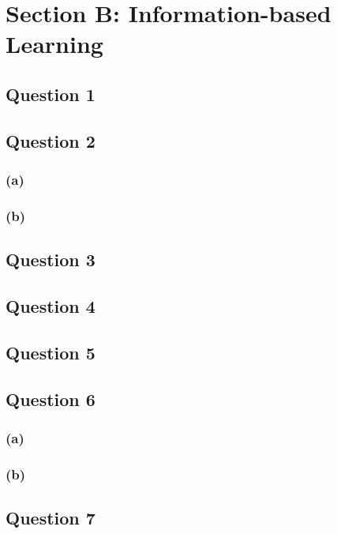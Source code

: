 \documentclass[10pt]{article}
\begin{document}
\section*{Section B: Information-based Learning}

\subsection*{Question 1}

\subsection*{Question 2}

\subsubsection*{(a)}

\subsubsection*{(b)}

\subsection*{Question 3}

\subsection*{Question 4}

\subsection*{Question 5}

\subsection*{Question 6}

\subsubsection*{(a)}

\subsubsection*{(b)}

\subsection*{Question 7}
\end{document}
